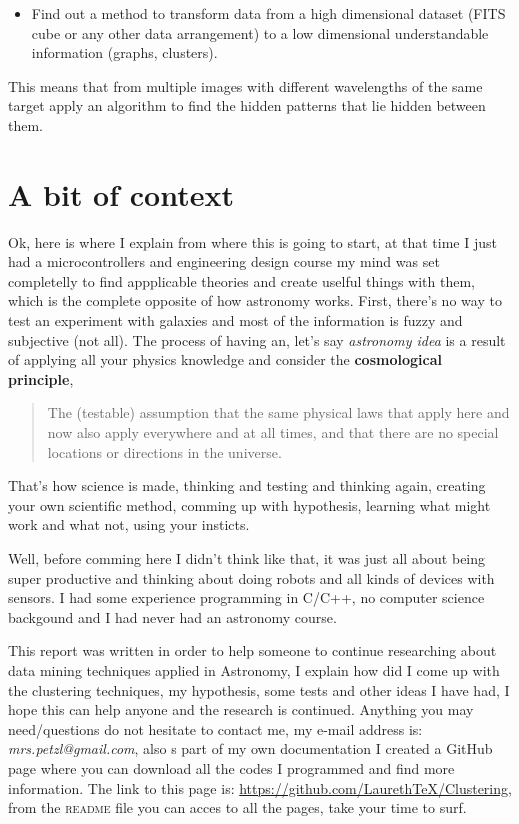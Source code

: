 \begin{itemize}
\item Find out a method to transform data from a high dimensional dataset (FITS cube or any other data arrangement) to a low dimensional understandable information (graphs, clusters).
\end{itemize}

This means that from multiple images with different wavelengths of the same target apply an algorithm to find the hidden patterns that lie hidden between them.

\section{A bit of context}
Ok, here is where I explain from where this is going to start, at that time I just had a microcontrollers and engineering design course my mind was set completelly to find appplicable theories and create uselful things with them, which is the complete opposite of how astronomy works. First, there's no way to test an experiment with galaxies and most of the information is fuzzy and subjective (not all). The process of having an, let's say \emph{astronomy idea} is a result of applying all your physics knowledge and consider the \textbf{cosmological principle},
\begin{quote}
The (testable) assumption that the same physical laws that apply here and now also apply everywhere and at all times, and that there are no special locations or directions in the universe.
\end{quote}

That's how science is made, thinking and testing and thinking again, creating your own scientific method, comming up with hypothesis, learning what might work and what not, using your insticts. 

Well, before comming here I didn't think like that, it was just all about being super productive and thinking about doing robots and all kinds of devices with sensors. I had some experience programming in C/C++, no computer science backgound and I had never had an astronomy course.

This report was written in order to help someone to continue researching about data mining techniques applied in Astronomy, I explain how did I come up with the clustering techniques, my hypothesis, some tests and other ideas I have had, I hope this can help anyone and the research is continued. Anything you may need/questions do not hesitate to contact me, my e-mail address is: \emph{mrs.petzl@gmail.com}, also s part of my own documentation I created a GitHub page where you can download all the codes I programmed and find more information. The link to this page is: \url{https://github.com/LaurethTeX/Clustering}, from the \textsc{readme} file you can acces to all the pages, take your time to surf.

